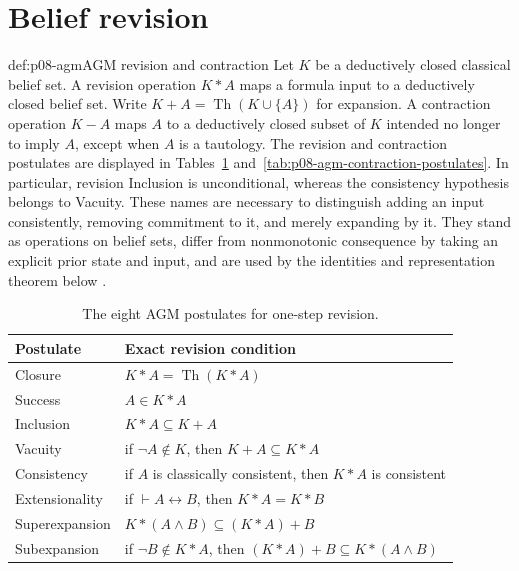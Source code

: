 \section{Belief revision}

\begin{hbdefinition}{def:p08-agm}{AGM revision and contraction}
Let \(K\) be a deductively closed classical belief set. A revision operation
\(K*A\) maps a formula input to a deductively closed belief set.  Write
\(K+A=\operatorname{Th}(K\cup\{A\})\) for expansion.  A contraction operation
\(K-A\) maps \(A\) to a deductively closed subset of \(K\) intended no longer
to imply \(A\), except when \(A\) is a tautology.  The revision and contraction
postulates are displayed in
Tables~\ref{tab:p08-agm-postulates}
and~\ref{tab:p08-agm-contraction-postulates}.  In particular, revision
Inclusion is unconditional, whereas the consistency hypothesis belongs to
Vacuity.  These names are necessary to distinguish adding an input
consistently, removing commitment to it, and merely expanding by it.  They
stand as operations on belief sets, differ from nonmonotonic consequence by
taking an explicit prior state and input, and are used by the identities and
representation theorem below
\cite{AlchourronGardenforsMakinson1985}.
\end{hbdefinition}

\begin{table}[htbp]
\centering\small
\begin{tabularx}{\textwidth}{@{}l X@{}}
\toprule
Postulate & Exact revision condition \\
\midrule
Closure & \(K*A=\operatorname{Th}(K*A)\) \\
Success & \(A\in K*A\) \\
Inclusion & \(K*A\subseteq K+A\) \\
Vacuity & if \(\neg A\notin K\), then \(K+A\subseteq K*A\) \\
Consistency & if \(A\) is classically consistent, then \(K*A\) is consistent \\
Extensionality & if \(\vdash A\leftrightarrow B\), then \(K*A=K*B\) \\
Superexpansion & \(K*(A\land B)\subseteq (K*A)+B\) \\
Subexpansion & if \(\neg B\notin K*A\), then
  \((K*A)+B\subseteq K*(A\land B)\) \\
\bottomrule
\end{tabularx}
\caption{The eight AGM postulates for one-step revision.}
\label{tab:p08-agm-postulates}
\end{table}

